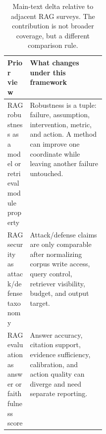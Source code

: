 \begin{table}[t]
\centering
\scriptsize
\begin{tabularx}{\linewidth}{p{0.23\linewidth}X}
\toprule
\textbf{Prior view} & \textbf{What changes under this framework} \\
\midrule
RAG robustness as a model or retrieval module property & Robustness is a tuple: failure, assumption, intervention, metric, and action. A method can improve one coordinate while leaving another failure untouched. \\
RAG security as attack/defense taxonomy & Attack/defense claims are only comparable after normalizing corpus write access, query control, retriever visibility, budget, and output target. \\
RAG evaluation as answer or faithfulness score & Answer accuracy, citation support, evidence sufficiency, calibration, and action quality can diverge and need separate reporting. \\
\bottomrule
\end{tabularx}
\caption{Main-text delta relative to adjacent RAG surveys. The contribution is not broader coverage, but a different comparison rule.}
\label{tab:prior-survey-delta-main}
\end{table}

